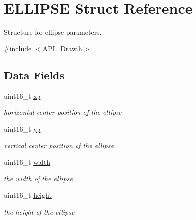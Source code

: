 \hypertarget{struct_e_l_l_i_p_s_e}{}\section{E\+L\+L\+I\+P\+SE Struct Reference}
\label{struct_e_l_l_i_p_s_e}


Structure for ellipse parameters.  




{\ttfamily \#include $<$A\+P\+I\+\_\+\+Draw.\+h$>$}

\subsection*{Data Fields}
\begin{DoxyCompactItemize}
\item 
\mbox{\label{struct_e_l_l_i_p_s_e_a949409b5dddb52782ff2cb935f4640fa}} 
uint16\+\_\+t \hyperlink{struct_e_l_l_i_p_s_e_a949409b5dddb52782ff2cb935f4640fa}{xp}
\begin{DoxyCompactList}\small\item\em horizontal center position of the ellipse \end{DoxyCompactList}\item 
\mbox{\label{struct_e_l_l_i_p_s_e_a59b81f7ac350cf9080d3d0b767580e4d}} 
uint16\+\_\+t \hyperlink{struct_e_l_l_i_p_s_e_a59b81f7ac350cf9080d3d0b767580e4d}{yp}
\begin{DoxyCompactList}\small\item\em vertical center position of the ellipse \end{DoxyCompactList}\item 
\mbox{\label{struct_e_l_l_i_p_s_e_ad0eab1042455a2067c812ab8071d5376}} 
uint16\+\_\+t \hyperlink{struct_e_l_l_i_p_s_e_ad0eab1042455a2067c812ab8071d5376}{width}
\begin{DoxyCompactList}\small\item\em the width of the ellipse \end{DoxyCompactList}\item 
\mbox{\label{struct_e_l_l_i_p_s_e_a81c9f8d0b8c3b49d770be14dbe9f0d37}} 
uint16\+\_\+t \hyperlink{struct_e_l_l_i_p_s_e_a81c9f8d0b8c3b49d770be14dbe9f0d37}{height}
\begin{DoxyCompactList}\small\item\em the height of the ellipse \end{DoxyCompactList}\item 

\end{DoxyCompactItemize}
